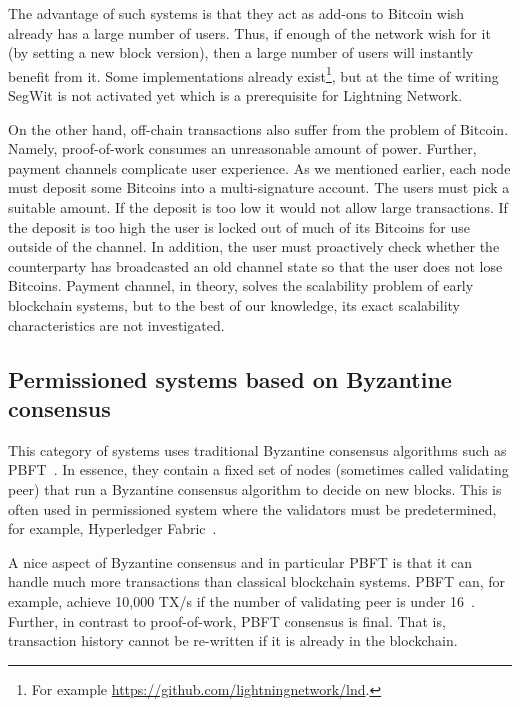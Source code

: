 The advantage of such systems is that they act as add-ons to Bitcoin wish already has a large number of users.
Thus, if enough of the network wish for it (by setting a new block version),
then a large number of users will instantly benefit from it.
Some implementations already exist\footnote{For example \url{https://github.com/lightningnetwork/lnd}.},
but at the time of writing SegWit is not activated yet which is a prerequisite for Lightning Network.

On the other hand, off-chain transactions also suffer from the problem of Bitcoin.
Namely, proof-of-work consumes an unreasonable amount of power.
Further, payment channels complicate user experience.
As we mentioned earlier, each node must deposit some Bitcoins into a multi-signature account.
The users must pick a suitable amount.
If the deposit is too low it would not allow large transactions.
If the deposit is too high the user is locked out of much of its Bitcoins for use outside of the channel.
In addition, the user must proactively check whether the counterparty has broadcasted an old channel state so that the user does not lose Bitcoins.
Payment channel, in theory, solves the scalability problem of early blockchain systems,
but to the best of our knowledge, its exact scalability characteristics are not investigated.



\subsection{Permissioned systems based on Byzantine consensus}

This category of systems uses traditional Byzantine consensus algorithms such as PBFT~\cite{castro1999practical}.
In essence, they contain a fixed set of nodes (sometimes called validating peer) that run a Byzantine consensus algorithm to decide on new blocks.
This is often used in permissioned system where the validators must be predetermined,
for example, Hyperledger Fabric~\cite{cachin2016architecture}.

A nice aspect of Byzantine consensus and in particular PBFT is that it can handle much more transactions than classical blockchain systems.
PBFT can, for example, achieve 10,000 TX/s if the number of validating peer is under 16~\cite[Section 5.2]{miller2016honey}.
Further, in contrast to proof-of-work, PBFT consensus is final.
That is, transaction history cannot be re-written if it is already in the blockchain.

